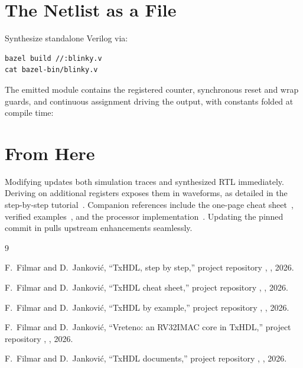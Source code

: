 \documentclass[journal,9pt]{IEEEtran}
\begin{document}


\section{The Netlist as a File}
\label{sec:z-netlist}

Synthesize standalone Verilog via:

\begin{lstlisting}[style=ascii]
bazel build //:blinky.v
cat bazel-bin/blinky.v
\end{lstlisting}

The emitted module contains the registered counter, synchronous reset and wrap
guards, and continuous assignment driving the output, with constants folded
at compile time:



\section{From Here}
\label{sec:z-next}

Modifying  updates both simulation traces and synthesized RTL
immediately. Deriving  on additional registers exposes them in
waveforms, as detailed in the step-by-step tutorial~\cite{tutorial}. Companion
references include the one-page cheat sheet~\cite{cheatsheet}, verified
examples~\cite{examples}, and the processor implementation~\cite{vreteno}.
Updating the pinned commit in  pulls upstream enhancements
seamlessly.

\begin{thebibliography}{9}

F.~Filmar and D.~Janković, ``TxHDL, step by step,'' project
repository , , 2026.

F.~Filmar and D.~Janković, ``TxHDL cheat sheet,'' project repository
, , 2026.

F.~Filmar and D.~Janković, ``TxHDL by example,'' project repository
, , 2026.

F.~Filmar and D.~Janković, ``Vreteno: an RV32IMAC core in TxHDL,''
project repository , , 2026.

F.~Filmar and D.~Janković, ``TxHDL documents,'' project repository
, , 2026.

\end{thebibliography}
\end{document}
